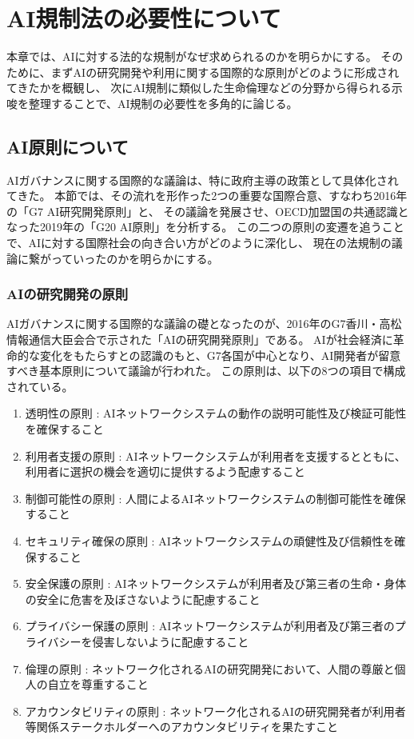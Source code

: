 \chapter{AI規制法の必要性について}
本章では、AIに対する法的な規制がなぜ求められるのかを明らかにする。
そのために、まずAIの研究開発や利用に関する国際的な原則がどのように形成されてきたかを概観し、
次にAI規制に類似した生命倫理などの分野から得られる示唆を整理することで、AI規制の必要性を多角的に論じる。

\section{AI原則について} %
AIガバナンスに関する国際的な議論は、特に政府主導の政策として具体化されてきた。
本節では、その流れを形作った2つの重要な国際合意、すなわち2016年の「G7 AI研究開発原則」と、
その議論を発展させ、OECD加盟国の共通認識となった2019年の「G20 AI原則」を分析する。
この二つの原則の変遷を追うことで、AIに対する国際社会の向き合い方がどのように深化し、
現在の法規制の議論に繋がっていったのかを明らかにする。

\subsection{AIの研究開発の原則} 
AIガバナンスに関する国際的な議論の礎となったのが、2016年のG7香川・高松情報通信大臣会合で示された「AIの研究開発原則」である。
AIが社会経済に革命的な変化をもたらすとの認識のもと、G7各国が中心となり、AI開発者が留意すべき基本原則について議論が行われた。
この原則は、以下の8つの項目で構成されている。

\begin{enumerate}
  \item 透明性の原則 : AIネットワークシステムの動作の説明可能性及び検証可能性を確保すること
  \item 利用者支援の原則 : AIネットワークシステムが利用者を支援するとともに、利用者に選択の機会を適切に提供するよう配慮すること
  \item 制御可能性の原則 : 人間によるAIネットワークシステムの制御可能性を確保すること
  \item セキュリティ確保の原則 : AIネットワークシステムの頑健性及び信頼性を確保すること
  \item 安全保護の原則 : AIネットワークシステムが利用者及び第三者の生命・身体の安全に危害を及ぼさないように配慮すること
  \item プライバシー保護の原則 : AIネットワークシステムが利用者及び第三者のプライバシーを侵害しないように配慮すること
  \item 倫理の原則 : ネットワーク化されるAIの研究開発において、人間の尊厳と個人の自立を尊重すること
  \item アカウンタビリティの原則 : ネットワーク化されるAIの研究開発者が利用者等関係ステークホルダーへのアカウンタビリティを果たすこと
\end{enumerate}

